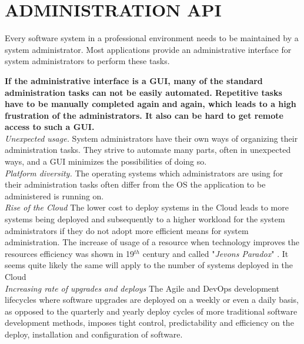 \newpage
\section*{ADMINISTRATION API}
Every software system in a professional environment needs to be maintained by a system administrator.
Most applications provide an administrative interface for system administrators to perform these tasks.
\begin{center}
  
\end{center}
\textbf{If the administrative interface is a GUI, many of the standard administration tasks can not be easily automated. Repetitive tasks have to be manually completed again and again, which leads to a high frustration of the administrators. It also can be hard to get remote access to such a GUI.}\\

\textit{Unexpected usage.} System administrators have their own ways of organizing their administration tasks. They strive to automate many parts, often in unexpected ways, and a GUI minimizes the possibilities of doing so.\\

\textit{Platform diversity.} The operating systems which administrators are using for their administration tasks often differ from the OS the application to be administered is running on.\\

\textit{Rise of the Cloud} The lower cost to deploy systems in the Cloud leads to more systems being deployed and subsequently to a higher workload for the system administrators if they do not adopt more efficient means for system administration. 
The increase of usage of a resource when technology improves the resources efficiency was shown in 19$^{th}$ century and called "\textit{Jevons Paradox}" \cite{Polimeni2008}. It seems quite likely the same will apply to the number of systems deployed in the Cloud\\

\textit{Increasing rate of upgrades and deploys} The Agile and DevOps development lifecycles where software upgrades are deployed on a weekly or even a  daily basis, as opposed to the quarterly and yearly deploy cycles of more traditional software development methods, imposes tight control, predictability and efficiency on the deploy, installation and configuration of software. \cite{Humble2010}
\begin{center}
   
\end{center}


